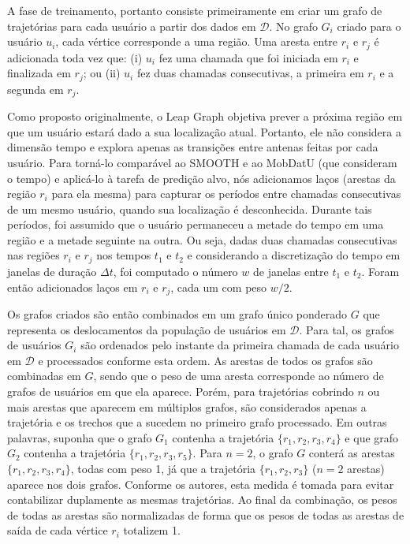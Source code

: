 \documentclass[10pt, a4paper, onecolumn, conference, compsocconf]{IEEEtran}
\begin{document}
A fase de treinamento, portanto consiste  primeiramente em criar um grafo de trajetórias para cada usuário  a partir dos dados em $\mathcal{D}$. No grafo $G_i$ criado para o usuário $u_i$,   cada vértice corresponde a uma região. Uma aresta entre $r_i$ e $r_j$ é adicionada toda vez que: (i) $u_i$ fez uma chamada que foi iniciada em $r_i$ e finalizada em $r_j$; ou (ii)  $u_i$ fez duas chamadas consecutivas, a primeira em $r_i$ e a segunda em $r_j$. 

Como proposto originalmente, o Leap Graph objetiva prever a próxima região em que um usuário estará dado a sua localização atual. Portanto, ele não considera a dimensão tempo e explora apenas as transições entre antenas feitas por cada usuário.  Para torná-lo comparável ao SMOOTH e ao MobDatU (que consideram o tempo)  e aplicá-lo à  tarefa de predição alvo,  nós adicionamos laços (arestas da região $r_i$ para ela mesma) para capturar os períodos entre chamadas consecutivas de um mesmo usuário, quando sua localização é desconhecida. Durante tais períodos, foi assumido que o usuário permaneceu a metade do tempo em uma região e a metade seguinte na outra. Ou seja, dadas duas chamadas consecutivas nas regiões $r_i$ e $r_j$ nos tempos $t_1$ e $t_2$ e considerando a discretização do tempo em janelas de duração $\Delta t$, foi computado o número  $w$ de janelas entre $t_1$ e $t_2$. Foram então adicionados laços em $r_i$ e $r_j$, cada um com peso $w/2$. 

Os grafos criados são então combinados em um grafo único ponderado $G$ que representa os deslocamentos  da população de usuários em $\mathcal{D}$. Para tal, os grafos de usuários $G_i$ são ordenados pelo instante da primeira chamada de cada usuário em $\mathcal{D}$ e processados conforme esta ordem. As arestas de todos os grafos são combinadas em $G$, sendo que o peso de uma aresta corresponde ao número de grafos de usuários em que ela aparece. Porém, para trajetórias cobrindo $n$ ou mais arestas que aparecem em múltiplos grafos, são considerados apenas a trajetória e os trechos que a sucedem  no primeiro grafo processado.  Em outras palavras, suponha que o grafo $G_1$ contenha a trajetória $\{r_1,r_2,r_3,r_4\}$ e que  grafo $G_2$ contenha a trajetória $\{r_1, r_2, r_3, r_5\}$.  Para $n=2$, o  grafo $G$ conterá as arestas $\{r_1, r_2, r_3, r_4\}$,  todas com peso 1, já que a trajetória $\{r_1,r_2,r_3\}$ ($n=2$ arestas) aparece nos dois grafos. Conforme os autores, esta medida é tomada para evitar contabilizar duplamente as mesmas trajetórias.  Ao final da combinação, os pesos de todas as arestas são normalizadas de forma que os pesos de todas as arestas de saída de cada vértice $r_i$ totalizem 1. 
\end{document}
